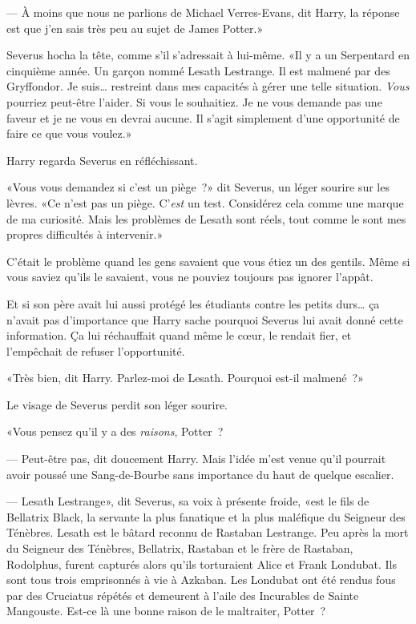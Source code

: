 --- À moins que nous ne parlions de Michael Verres-Evans, dit Harry, la réponse est que j'en sais très peu au sujet de James Potter.»

Severus hocha la tête, comme s'il s'adressait à lui-même. «Il y a un Serpentard en cinquième année. Un garçon nommé Lesath Lestrange. Il est malmené par des Gryffondor. Je suis… restreint dans mes capacités à gérer une telle situation. \emph{Vous} pourriez peut-être l'aider. Si vous le souhaitiez. Je ne vous demande pas une faveur et je ne vous en devrai aucune. Il s'agit simplement d'une opportunité de faire ce que vous voulez.»

Harry regarda Severus en réfléchissant.

«Vous vous demandez si c'est un piège~?» dit Severus, un léger sourire sur les lèvres. «Ce n'est pas un piège. C'\emph{est} un test. Considérez cela comme une marque de ma curiosité. Mais les problèmes de Lesath sont réels, tout comme le sont mes propres difficultés à intervenir.»

C'était le problème quand les gens savaient que vous étiez un des gentils. Même si vous saviez qu'ils le savaient, vous ne pouviez toujours pas ignorer l'appât.

Et si son père avait lui aussi protégé les étudiants contre les petits durs… ça n'avait pas d'importance que Harry sache pourquoi Severus lui avait donné cette information. Ça lui réchauffait quand même le cœur, le rendait fier, et l'empêchait de refuser l'opportunité.

«Très bien, dit Harry. Parlez-moi de Lesath. Pourquoi est-il malmené~?»

Le visage de Severus perdit son léger sourire.

«Vous pensez qu'il y a des \emph{raisons}, Potter~?

--- Peut-être pas, dit doucement Harry. Mais l'idée m'est venue qu'il pourrait avoir poussé une Sang-de-Bourbe sans importance du haut de quelque escalier.

--- Lesath Lestrange», dit Severus, sa voix à présente froide, «est le fils de Bellatrix Black, la servante la plus fanatique et la plus maléfique du Seigneur des Ténèbres. Lesath est le bâtard reconnu de Rastaban Lestrange. Peu après la mort du Seigneur des Ténèbres, Bellatrix, Rastaban et le frère de Rastaban, Rodolphus, furent capturés alors qu'ils torturaient Alice et Frank Londubat. Ils sont tous trois emprisonnés à vie à Azkaban. Les Londubat ont été rendus fous par des Cruciatus répétés et demeurent à l'aile des Incurables de Sainte Mangouste. Est-ce là une bonne raison de le maltraiter, Potter~?

